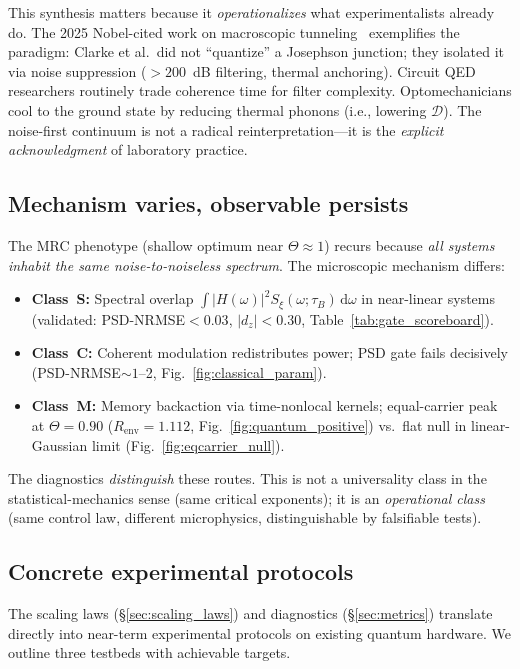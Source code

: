 \documentclass[11pt,letterpaper]{article}
\begin{document}
This synthesis matters because it \emph{operationalizes} what 
experimentalists already do. The 2025 Nobel-cited work on macroscopic 
tunneling~\cite{nobel_background_2025} exemplifies the paradigm: Clarke 
et al.\ did not ``quantize'' a Josephson junction; they isolated it via 
noise suppression ($>200$~dB filtering, thermal anchoring). Circuit QED 
researchers routinely trade coherence time for filter complexity. 
Optomechanicians cool to the ground state by reducing thermal phonons 
(i.e., lowering $\mathcal{D}$). The noise-first continuum is not a 
radical reinterpretation—it is the \emph{explicit acknowledgment} of 
laboratory practice.

\subsection{Mechanism varies, observable persists}

The MRC phenotype (shallow optimum near $\Theta\approx 1$) recurs
because \emph{all systems inhabit the same noise-to-noiseless spectrum}.
The microscopic mechanism differs:
\begin{itemize}[leftmargin=*,noitemsep,topsep=0pt]
\item \textbf{Class~S:} Spectral overlap $\int |H(\omega)|^2
S_\xi(\omega;\tau_B)\,\mathrm{d}\omega$ in near-linear systems
(validated: PSD-NRMSE$<0.03$, $|d_z|<0.30$,
Table~\ref{tab:gate_scoreboard}).
\item \textbf{Class~C:} Coherent modulation redistributes power; PSD
gate fails decisively (PSD-NRMSE$\sim 1$--2, Fig.~\ref{fig:classical_param}).
\item \textbf{Class~M:} Memory backaction via time-nonlocal kernels;
equal-carrier peak at $\Theta=0.90$ ($R_{\text{env}}=1.112$,
Fig.~\ref{fig:quantum_positive}) vs.\ flat null in linear-Gaussian limit
(Fig.~\ref{fig:eqcarrier_null}).
\end{itemize}
The diagnostics \emph{distinguish} these routes. This is not a
universality class in the statistical-mechanics sense (same critical
exponents); it is an \emph{operational class} (same control law,
different microphysics, distinguishable by falsifiable tests).

\subsection{Concrete experimental protocols}
\label{sec:experiments}

The scaling laws (§\ref{sec:scaling_laws}) and diagnostics
(§\ref{sec:metrics}) translate directly into near-term experimental
protocols on existing quantum hardware. We outline three testbeds with
achievable targets.
\end{document}
